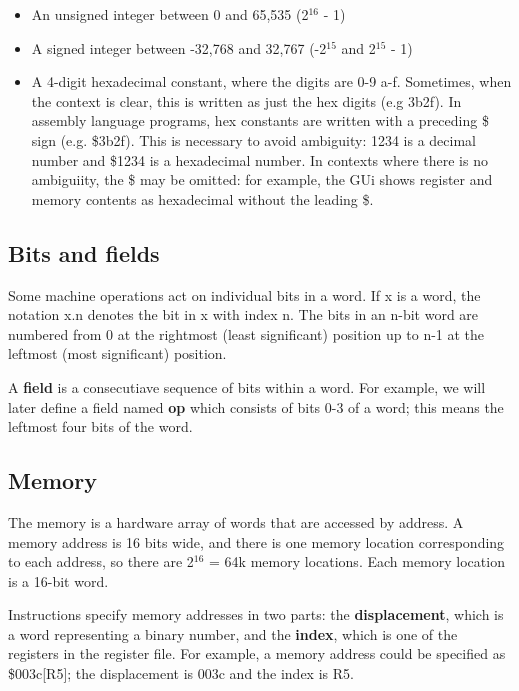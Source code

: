 \documentclass[11pt]{article}
\begin{document}
\begin{itemize}
\item An unsigned integer between 0 and 65,535 (2\(^{\text{16}}\) - 1)
\item A signed integer between -32,768 and 32,767 (-2\(^{\text{15}}\) and 2\(^{\text{15}}\) - 1)
\item A 4-digit hexadecimal constant, where the digits are 0-9 a-f.
Sometimes, when the context is clear, this is written as just the
hex digits (e.g 3b2f).  In assembly language programs, hex constants
are written with a preceding \$ sign (e.g. \$3b2f).  This is necessary
to avoid ambiguity: 1234 is a decimal number and \$1234 is a
hexadecimal number.  In contexts where there is no ambiguiity, the \$
may be omitted: for example, the GUi shows register and memory
contents as hexadecimal without the leading \$.
\end{itemize}

\subsection*{Bits and fields}
\label{sec:org5e7183e}

Some machine operations act on individual bits in a word.  If x is a
word, the notation x.n denotes the bit in x with index n.  The bits in
an n-bit word are numbered from 0 at the rightmost (least significant)
position up to n-1 at the leftmost (most significant) position.

A \textbf{field} is a consecutiave sequence of bits within a word.  For
example, we will later define a field named \textbf{op} which consists of
bits 0-3 of a word; this means the leftmost four bits of the word.

\subsection*{Memory}
\label{sec:orga11beb5}

The memory is a hardware array of words that are accessed by address.
A memory address is 16 bits wide, and there is one memory location
corresponding to each address, so there are 2\(^{\text{16}}\) = 64k memory
locations.  Each memory location is a 16-bit word.

Instructions specify memory addresses in two parts: the
\textbf{displacement}, which is a word representing a binary number, and the
\textbf{index}, which is one of the registers in the register file.  For
example, a memory address could be specified as \$003c[R5]; the
displacement is 003c and the index is R5.
\end{document}
